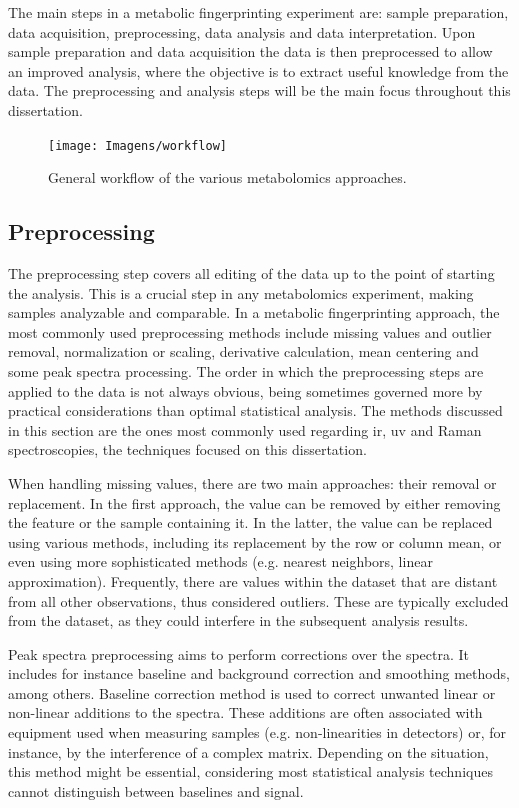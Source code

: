 The main steps in a metabolic fingerprinting experiment are: sample preparation, data acquisition, preprocessing, data analysis and data interpretation. Upon sample preparation and data acquisition the data is then preprocessed to allow an improved analysis, where the objective is to extract useful knowledge from the data. The preprocessing and analysis steps will be the main focus throughout this dissertation.

\begin{figure}[!ht]
	\centering
	\texttt{[image: Imagens/workflow]}
	\caption{General workflow of the various metabolomics approaches.}
	\label{workflow}
\end{figure}


\subsection{Preprocessing}

The preprocessing step covers all editing of the data up to the point of starting the analysis. This is a crucial step in any metabolomics experiment, making samples analyzable and comparable. In a metabolic fingerprinting approach, the most commonly used preprocessing methods include missing values and outlier removal, normalization or scaling, derivative calculation, mean centering and some peak spectra processing. The order in which the preprocessing steps are applied to the data is not always obvious, being sometimes governed more by practical considerations than optimal statistical analysis. The methods discussed in this section are the ones most commonly used regarding \gls{ir}, \gls{uv} and Raman spectroscopies, the techniques focused on this dissertation.

When handling missing values, there are two main approaches: their removal or replacement. In the first approach, the value can be removed by either removing the feature or the sample containing it. In the latter, the value can be replaced using various methods, including its replacement by the row or column mean, or even using more sophisticated methods (e.g. nearest neighbors, linear approximation). Frequently, there are values within the dataset that are distant from all other observations, thus considered outliers. These are typically excluded from the dataset, as they could interfere in the subsequent analysis results.

Peak spectra preprocessing aims to perform corrections over the spectra. It includes for instance baseline and background correction and smoothing methods, among others. Baseline correction method is used to correct unwanted linear or non-linear additions to the spectra. These additions are often associated with equipment used when measuring samples (e.g. non-linearities in detectors) or, for instance, by the interference of a complex matrix. Depending on the situation, this method might be essential, considering most statistical analysis techniques cannot distinguish between baselines and signal. 

